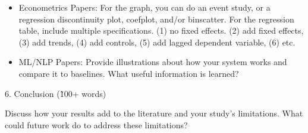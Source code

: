 \documentclass{article}
\begin{document}
\begin{itemize}
    \item Econometrics Papers: For the graph, you can do an event study, or a regression discontinuity plot, coefplot, and/or binscatter. For the regression table, include multiple specifications. (1) no fixed effects. (2) add fixed effects, (3) add trends, (4) add controls, (5) add lagged dependent variable, (6) etc.
    \item ML/NLP Papers: Provide illustrations about how your system works and compare it to baselines. What useful information is learned?
\end{itemize}

6. Conclusion (\~100+ words)

Discuss how your results add to the literature and your study's limitations. What could future work do to address these limitations?
\end{document}

